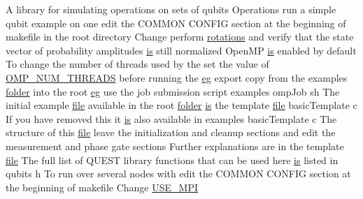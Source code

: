 \begin{DoxyCompactItemize}
A library for simulating operations on sets of qubits Operations run a simple qubit example on one edit the COMMON CONFIG section at the beginning of makefile in the root directory Change perform \hyperlink{README_8md_a168d0f076329da35a2b080049c35cecd}{rotations} and verify that the state vector of probability amplitudes \hyperlink{README_8md_ac361bc388656077907485b42e1531a85}{is} still normalized OpenMP \hyperlink{README_8md_ac361bc388656077907485b42e1531a85}{is} enabled by default To change the number of threads used by the set the value of \hyperlink{README_8md_ac0f875e6c5b5526a6781e0fbba81e6a4}{OMP\_\-NUM\_\-THREADS} before running the \hyperlink{README_8md_a60a90a09308ad7ec0ea2ac389281518b}{eg} export copy from the examples \hyperlink{README_8md_ac5527449269e33be598e819921cd9e43}{folder} into the root \hyperlink{README_8md_a60a90a09308ad7ec0ea2ac389281518b}{eg} use the job submission script examples ompJob sh The initial example \hyperlink{README_8md_a5078360f0afc4e756290c3197d1abfe9}{file} available in the root \hyperlink{README_8md_ac5527449269e33be598e819921cd9e43}{folder} \hyperlink{README_8md_ac361bc388656077907485b42e1531a85}{is} the template \hyperlink{README_8md_a5078360f0afc4e756290c3197d1abfe9}{file} basicTemplate c If you have removed this it \hyperlink{README_8md_ac361bc388656077907485b42e1531a85}{is} also available in examples basicTemplate c The structure of this \hyperlink{README_8md_a5078360f0afc4e756290c3197d1abfe9}{file} leave the initialization and cleanup sections and edit the measurement and phase gate sections Further explanations are in the template \hyperlink{README_8md_a5078360f0afc4e756290c3197d1abfe9}{file} The full list of QUEST library functions that can be used here \hyperlink{README_8md_ac361bc388656077907485b42e1531a85}{is} listed in qubits h To run over several nodes with edit the COMMON CONFIG section at the beginning of makefile Change \hyperlink{README_8md_a0da642c7a89d38d17508c3eea1b45015}{USE\_\-MPI}
\item 

\end{DoxyCompactItemize}
